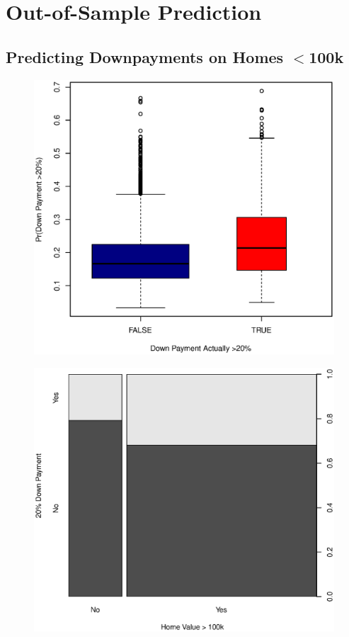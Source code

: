 \documentclass[11pt, fleqn]{article}
\begin{document}
\section{Out-of-Sample Prediction}
\subsection{Predicting Downpayments on Homes $<$100k}
\begin{figure}[!htb]
  \centering
  \includegraphics[scale=.5]{oos_lt100k.eps}
  \caption{}
  \label{fig:oos_lt100k}
\end{figure}

\begin{figure}[!htb]
  \centering
  \includegraphics[scale=.5]{home_value_vs_20_down.eps}
  \caption{}
  \label{fig:value_20dwn}
\end{figure}
\end{document}
